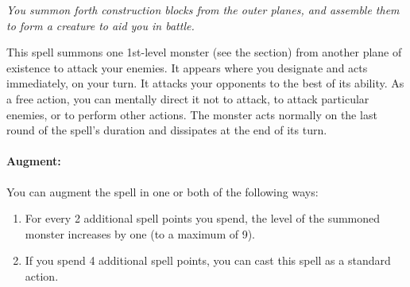 \emph{You summon forth construction blocks from the outer planes, and assemble them to form a creature to aid you in battle.}

This spell summons one 1st-level monster (see the  section) from another plane of existence to attack your enemies. 
It appears where you designate and acts immediately, on your turn. It attacks your opponents to the best of its ability. 
As a free action, you can mentally direct it not to attack, to attack particular enemies, or to perform other actions. 
The monster acts normally on the last round of the spell's duration and dissipates at the end of its turn.

\paragraph{Augment:} You can augment the spell in one or both of the following ways: 
\begin{enumerate}
 \item For every 2 additional spell points you spend, the level of the summoned monster increases by one (to a maximum of 9).
 \item If you spend 4 additional spell points, you can cast this spell as a standard action.
\end{enumerate}

